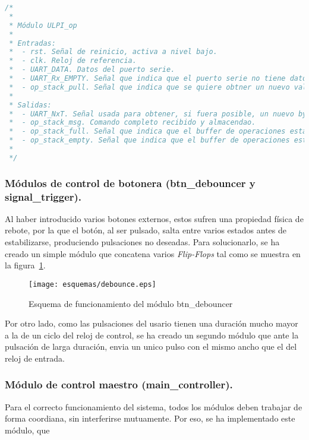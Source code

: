\begin{lstlisting}[language=Verilog,
    caption={Entradas y salidas del módulo ULPI\_op.},
    label=src:resultados-modulos-ulpi-op]
/*
 *
 * Módulo ULPI_op
 *
 * Entradas:
 *  - rst. Señal de reinicio, activa a nivel bajo.
 *  - clk. Reloj de referencia.
 *  - UART_DATA. Datos del puerto serie.
 *  - UART_Rx_EMPTY. Señal que indica que el puerto serie no tiene datos disponibles.
 *  - op_stack_pull. Señal que indica que se quiere obtner un nuevo valor del buffer de operaciones.
 *
 * Salidas:
 *  - UART_NxT. Señal usada para obtener, si fuera posible, un nuevo byte.
 *  - op_stack_msg. Comando completo recibido y almacendao.
 *  - op_stack_full. Señal que indica que el buffer de operaciones está lleno.
 *  - op_stack_empty. Señal que indica que el buffer de operaciones está vacio.
 *
 */
\end{lstlisting}


\subsubsection{Módulos de control de botonera (btn\_debouncer y signal\_trigger).}
Al haber introducido varios botones externos, estos sufren una propiedad física de rebote, por la que el botón, al ser pulsado, salta entre varios estados antes de estabilizarse, produciendo pulsaciones no deseadas. Para solucionarlo, se ha creado un simple módulo que concatena varios \emph{Flip-Flops} tal como se muestra en la figura~\ref{fig:esquema-debounce}.

\begin{figure}[htb]
    \centering
    \texttt{[image: esquemas/debounce.eps]}
    \caption{Esquema de funcionamiento del módulo btn\_debouncer}
    \label{fig:esquema-debounce}
\end{figure}

Por otro lado, como las pulsaciones del usario tienen una duración mucho mayor a la de un ciclo del reloj de control, se ha creado un segundo módulo que ante la pulsación de larga duración, envia un unico pulso con el mismo ancho que el del reloj de entrada.


\subsubsection{Módulo de control maestro (main\_controller).}
Para el correcto funcionamiento del sistema, todos los módulos deben trabajar de forma coordiana, sin interferirse mutuamente. Por eso, se ha implementado este módulo, que 

